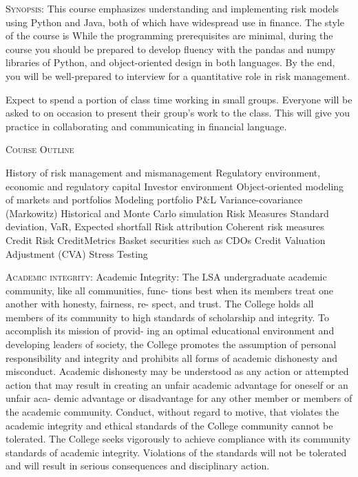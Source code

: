 \documentclass[11pt]{article}
\begin{document}
\textsc{Synopsis:} This course emphasizes understanding and implementing risk models using Python and Java, both of which have widespread use in finance. The style of the course is While the programming prerequisites are minimal, during the course you should be prepared to develop fluency with the pandas and numpy libraries of Python, and object-oriented design in both languages. By the end, you will be well-prepared to interview for a quantitative role in risk management.

Expect to spend a portion of class time working in small groups. Everyone will be asked to on occasion to present their group's work to the class. This will give you practice in collaborating and communicating in financial language.

\textsc{Course Outline} 

\begin{outline}[enumerate]
\1 History of risk management and mismanagement
	\2 Regulatory environment, economic and regulatory capital
	\2 Investor environment
\1 Object-oriented modeling of markets and portfolios
\1 Modeling portfolio P\&L 
	\2 Variance-covariance (Markowitz)
	\2 Historical and Monte Carlo simulation 
\1 Risk Measures
	\2 Standard deviation, VaR, Expected shortfall
	\2 Risk attribution
	\2 Coherent risk measures
\1 Credit Risk
	\2 CreditMetrics
	\2 Basket securities such as CDOs 
\1 Credit Valuation Adjustment (CVA)
\1 Stress Testing
\end{outline}

\textsc{Academic integrity}:  Academic Integrity:
The LSA undergraduate academic community, like all communities, func- tions best when its members treat one another with honesty, fairness, re- spect, and trust. The College holds all members of its community to high standards of scholarship and integrity. To accomplish its mission of provid- ing an optimal educational environment and developing leaders of society, the College promotes the assumption of personal responsibility and integrity and prohibits all forms of academic dishonesty and misconduct. Academic dishonesty may be understood as any action or attempted action that may result in creating an unfair academic advantage for oneself or an unfair aca- demic advantage or disadvantage for any other member or members of the academic community. Conduct, without regard to motive, that violates the
academic integrity and ethical standards of the College community cannot be tolerated. The College seeks vigorously to achieve compliance with its community standards of academic integrity. Violations of the standards will not be tolerated and will result in serious consequences and disciplinary action.
\end{document}
